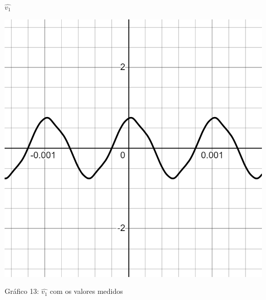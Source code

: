 \newpage
\begin{center}$\hat{v_1}$\end{center}
\begin{table}[h]
\centering
\includegraphics[scale=0.4]{figuras/v1-valores_medidos}
\end{table}\vspace{-6cm}\vspace{6cm}
\begin{center}
Gráfico 13: $\hat{v_1}$ com os valores medidos
\end{center}


